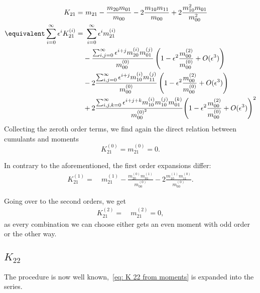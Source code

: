 \begin{equation*}
  \begin{aligned}
    K_{21} = &\ m_{21} - \frac{m_{20}m_{01}}{m_{00}}
         - 2\frac{m_{10}m_{11}}{m_{00}} + 2\frac{m_{10}^2 m_{01}}{m_{00}^2}
    \\
    \equivalent
    \sum_{i=0}^\infty \epsilon^i K_{21}^{(i)}
     = &\ \sum_{i=0}^\infty \epsilon^i m_{21}^{(i)}
    \\ &
    - \frac{\sum_{i,j=0}^\infty \epsilon^{i+j} m_{20}^{(i)} m_{01}^{(j)}}{m_{00}^{(0)}}
      \left(1 - \epsilon^2 \frac{m_{00}^{(2)}}{m_{00}^{(0)}}  + O(\epsilon^3)\right)
    \\ &
     - 2\frac{\sum_{i,j=0}^\infty \epsilon^{i+j} m_{10}^{(i)} m_{11}^{(j)}}{m_{00}^{(0)}}
      \left(1 - \epsilon^2 \frac{m_{00}^{(2)}}{m_{00}^{(0)}}  + O(\epsilon^3)\right)
     \\ &
     +
        2 \frac{\sum_{i,j,k=0}^\infty \epsilon^{i+j+k} m_{10}^{(i)} m_{10}^{(j)} m_{01}^{(k)}}{m_{00}^{{(0)}^2}}
        {
          \left(1 - \epsilon^2 \frac{m_{00}^{(2)}}{m_{00}^{(0)}}  + O(\epsilon^3)\right)
        }^2
   \end{aligned}
\end{equation*}
Collecting the zeroth order terms, we find again the direct relation between cumulants and moments
\begin{equation*}
  K_{21}^{(0)} = m_{21}^{(0)} = 0.
\end{equation*}

In contrary to the aforementioned, the first order expansions differ:
\begin{equation*}
  \begin{aligned}
    K_{21}^{(1)} = &\ m_{21}^{(1)}
    - \frac{m_{20}^{(0)} m_{01}^{(1)}}{m_{00}^{(0)}}
    - 2\frac{m_{10}^{(1)} m_{11}^{(0)}}{m_{00}^{(0)}}.
  \end{aligned}
\end{equation*}

Going over to the second orders, we get
\begin{equation*}
  \begin{aligned}
    K_{21}^{(2)} = &\ m_{21}^{(2)} = 0,
  \end{aligned}
\end{equation*}
as every combination we can choose either gets an even moment with odd order or the other way.

\subsection{\texorpdfstring{$K_{22}$}{K 22}}
\label{sub: K 22}
The procedure is now well known,~\eqref{eq: K 22 from moments} is expanded into the series.

